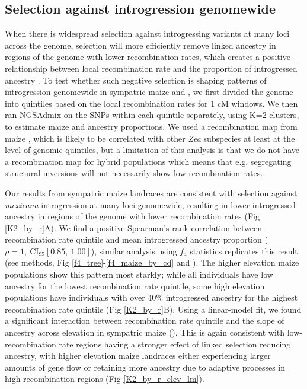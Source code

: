\subsection*{Selection against introgression genomewide} 
When there is widespread selection against introgressing variants at many loci across the genome, selection will more efficiently remove linked ancestry in regions of the genome with lower recombination rates, which creates a positive relationship between local recombination rate and the proportion of introgressed ancestry \cite{Veller:2019ge, Schumer:2018hc, Harris:2016fp, Juric:2016jj, Sankararaman:2014_neanderthals, Brandvain:2014cq, Aeschbacher:2017_mimulus, Kenney_Sweigart:2016_mimulus, Nelson:2021_mimulus, Martin:2019_butterflies, Edelman:2019_butterfly}.
To test whether such negative selection is shaping patterns of introgression genomewide in sympatric maize and \mexicana, we first divided the genome into quintiles based on the local recombination rates for 1 cM windows. 
We then ran NGSAdmix on the SNPs within each quintile separately, using K=2 clusters, to estimate maize and \mexicana ancestry proportions. We used a recombination map from maize \cite{Ogut:2015df}, which is likely to be correlated with other \textit{Zea} subspecies at least at the level of genomic quintiles, but a limitation of this analysis is that we do not have a recombination map for hybrid populations which means that e.g. segregating structural inversions will not necessarily show low recombination rates.

Our results from sympatric maize landraces are consistent with selection against \textit{mexicana} introgression at many loci genomewide, resulting in lower introgressed ancestry in regions of the genome with lower recombination rates (Fig \ref{K2_by_r}A). 
We find a positive Spearman's rank correlation between recombination rate quintile and mean introgressed \mexicana ancestry proportion ($\rho = 1,\ \text{CI}_{95}[0.85,\ 1.00]$),    similar analysis using $f_4$ statistics replicates this result (see methods, Fig \ref{f4_tree}-\ref{f4_maize_by_cd} and ). The higher elevation maize populations show this pattern most starkly; while all individuals have low \mexicana ancestry for the lowest recombination rate quintile, some high elevation populations have individuals with over 40\% introgressed ancestry for the highest recombination rate quintile (Fig \ref{K2_by_r}B). Using a linear-model fit, we found a significant interaction between recombination rate quintile and the slope of ancestry across elevation in sympatric maize (). 
This is again consistent with low-recombination rate regions having a stronger effect of linked selection reducing \mexicana ancestry, with higher elevation maize landraces either experiencing larger amounts of gene flow or retaining more ancestry due to adaptive processes in high recombination regions (Fig \ref{K2_by_r_elev_lm}).



